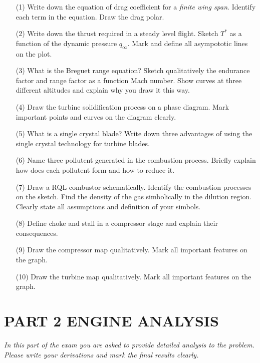 \documentclass[11pt]{article}
\begin{document}
\begin{itemize}
	\item[(1)] Write down the equation of drag coefficient for a \emph{finite wing span}. Identify each term in the equation. Draw the drag polar.
	
	\item[(2)] Write down the thrust required in a steady level flight. Sketch $T^*$ as a function of the dynamic pressure $q_\infty$. Mark and define all asympototic lines on the plot.
	
	\item[(3)] What is the Breguet range equation? Sketch qualitatively the endurance factor and range factor as a function Mach number. Show curves at three different altitudes and explain why you draw it this way.
	
	\item[(4)] Draw the turbine solidification process on a phase diagram. Mark important points and curves on the diagram clearly.
	
	\item[(5)] What is a single crystal blade? Write down three advantages of using the single crystal technology for turbine blades.
	
	\item[(6)] Name three pollutent generated in the combustion process. Briefly explain how does each pollutent form and how to reduce it.
	
	\item[(7)] Draw a RQL combustor schematically. Identify the combustion processes on the sketch. Find the density of the gas simbolically in the dilution region. Clearly state all assumptions and definition of your simbols.
	
	\item[(8)] Define choke and stall in a compressor stage and explain their consequences.
	
	\item[(9)] Draw the compressor map qualitatively. Mark all important features on the graph.
	
	\item[(10)] Draw the turbine map qualitatively. Mark all important features on the graph.
	
\end{itemize}


\newpage

\section{\textbf{PART 2} ENGINE ANALYSIS} %
\label{sec:_textbf_part_2_engine_analysis}
\noindent \emph{In this part of the exam you are asked to provide detailed analysis to the problem. Please write your derivations and mark the final results clearly.}
\end{document}

